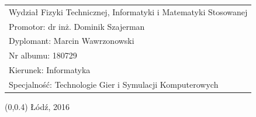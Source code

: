\documentclass[12pt, oneside, a4paper]{mwbk}
\newcommand\blankpage{%
	\null
	\thispagestyle{empty}%
	\newpage}
\begin{document}
\begin{titlepage}
\begin{center}
\selectfont
\hspace{-1cm}
\begin{tabular}{l}
Wydział Fizyki Technicznej, Informatyki i Matematyki Stosowanej \\
Promotor: dr inż. Dominik Szajerman \\
Dyplomant: Marcin Wawrzonowski \\
Nr albumu: 180729 \\
Kierunek: Informatyka \\
Specjalność: Technologie Gier i Symulacji Komputerowych
\end{tabular}
\end{center}
\vspace{-.5cm}
\begin{center}
\selectfont
\begin{textblock}{13}(0,0.4)
Łódź, 2016
\end{textblock}
\end{center}
\end{titlepage}

\blankpage

\tableofcontents













\lstlistoflistings

\listoffigures

\listoftables

\listofalgorithms
\end{document}
